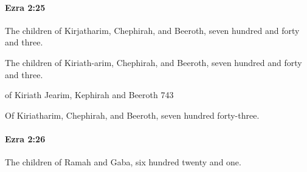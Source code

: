 		\paragraph{Ezra 2:25} %
			\label{EZRA-2-25}

			The children of Kirjatharim, Chephirah, and Beeroth, seven hundred and forty and three.

			\begin{versebox}
					\item[BHS] 
					\item[LXX] 
					\item[ASV] The children of Kiriath-arim, Chephirah, and Beeroth, seven hundred and forty and three.
					\item[NIV] of Kiriath Jearim, Kephirah and Beeroth 743
					\item[NRSV] Of Kiriatharim, Chephirah, and Beeroth, seven hundred forty-three.
			\end{versebox}

		\paragraph{Ezra 2:26} %
			\label{EZRA-2-26}

			The children of Ramah and Gaba, six hundred twenty and one.

